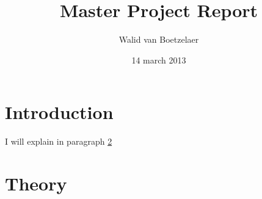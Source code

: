 \documentclass[a4paper,oneside,12pt]{article}
\author{Walid van Boetzelaer}
\title{Master Project Report}
\date{14 march 2013}
\begin{document}
 

 \maketitle
\tableofcontents
\newpage

\section{Introduction}

I will explain in paragraph \ref{theory}
\section{Theory}
\label{theory}



 
\end{document}
